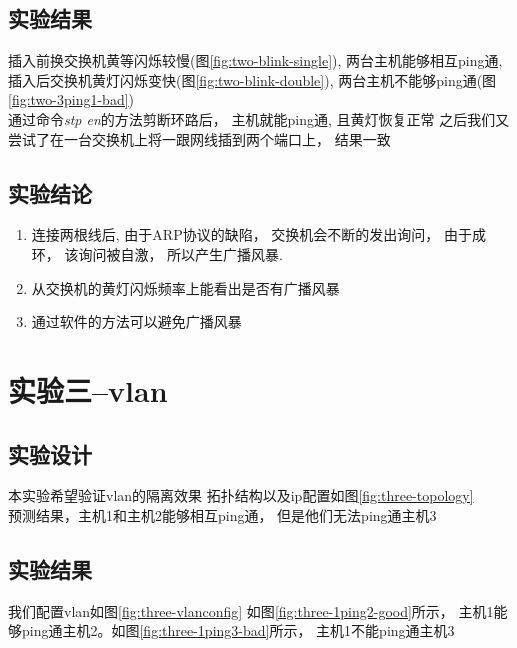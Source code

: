 	\subsection{实验结果}
		插入前换交换机黄等闪烁较慢(图\ref{fig:two-blink-single}), 两台主机能够相互ping通,
		插入后交换机黄灯闪烁变快(图\ref{fig:two-blink-double}), 两台主机不能够ping通(图\ref{fig:two-3ping1-bad})\\
		通过命令\emph{stp en}的方法剪断环路后， 主机就能ping通, 且黄灯恢复正常
		之后我们又尝试了在一台交换机上将一跟网线插到两个端口上， 结果一致

	\subsection{实验结论}
		\begin{enumerate}
		  \item 连接两根线后, 由于ARP协议的缺陷， 交换机会不断的发出询问， 由于成环， 该询问被自激， 所以产生广播风暴.
		  \item 从交换机的黄灯闪烁频率上能看出是否有广播风暴
		  \item 通过软件的方法可以避免广播风暴
		\end{enumerate}
\section{实验三--vlan}
	\subsection{实验设计}
		本实验希望验证vlan的隔离效果
		拓扑结构以及ip配置如图\ref{fig:three-topology}\\
	    预测结果，主机1和主机2能够相互ping通， 但是他们无法ping通主机3
	\subsection{实验结果}
		我们配置vlan如图\ref{fig:three-vlanconfig}
		如图\ref{fig:three-1ping2-good}所示， 主机1能够ping通主机2。如图\ref{fig:three-1ping3-bad}所示， 主机1不能ping通主机3
